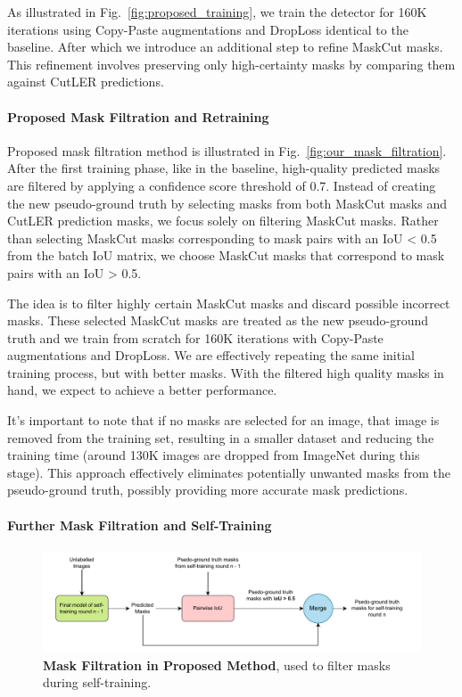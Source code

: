 As illustrated in Fig.~\ref{fig:proposed_training}, we train the detector for 160K iterations using Copy-Paste augmentations and DropLoss identical to the baseline. After which we introduce an additional step to refine MaskCut masks. This refinement involves preserving only high-certainty masks by comparing them against CutLER predictions.

\paragraph{Proposed Mask Filtration and Retraining}
Proposed mask filtration method is illustrated in Fig.~\ref{fig:our_mask_filtration}. After the first training phase, like in the baseline, high-quality predicted masks are filtered by applying a confidence score threshold of 0.7.  Instead of creating the new pseudo-ground truth by selecting masks from both MaskCut masks and CutLER prediction masks, we focus solely on filtering MaskCut masks. Rather than selecting MaskCut masks corresponding to mask pairs with an IoU < 0.5 from the batch IoU matrix, we choose MaskCut masks that correspond to mask pairs with an IoU > 0.5. 

The idea is to filter highly certain MaskCut masks and discard possible incorrect masks. These selected MaskCut masks are treated as the new pseudo-ground truth and we train from scratch for 160K iterations with Copy-Paste augmentations and DropLoss. We are effectively repeating the same initial training process, but with better masks. With the filtered high quality masks in hand, we expect to achieve a better performance. 

It’s important to note that if no masks are selected for an image, that image is removed from the training set, resulting in a smaller dataset and reducing the training time (around 130K images are dropped from ImageNet during this stage). This approach effectively eliminates potentially unwanted masks from the pseudo-ground truth, possibly providing more accurate mask predictions.

\paragraph{Further Mask Filtration and Self-Training}
\label{section:proposed_mask_filtration_self_training}
\begin{figure}
	\centering
	\includegraphics[width=1\textwidth]{Images/main/our_filtration_self_training.pdf}
	\caption[\textbf{Mask Filtration in Proposed Method During Self-Training}]{\textbf{Mask Filtration in Proposed Method}, used to filter masks during self-training.}
	\label{fig:our_mask_filtration_self_training}
\end{figure}


